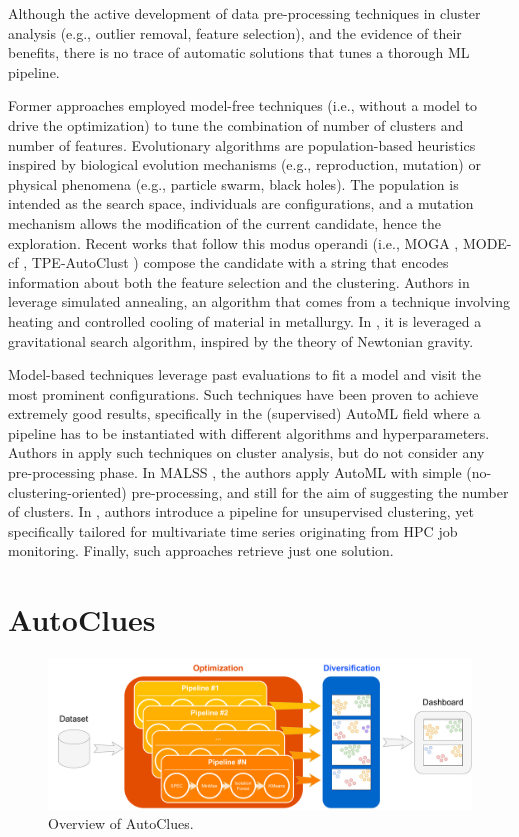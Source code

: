\documentclass[runningheads]{llncs}
\begin{document}
Although the active development of data pre-processing techniques in cluster analysis (e.g., outlier removal, feature selection), and the evidence of their benefits, there is no trace of automatic solutions that tunes a thorough ML pipeline.

Former approaches employed model-free techniques (i.e., without a model to drive the optimization) to tune the combination of number of clusters and number of features.
Evolutionary algorithms are population-based heuristics inspired by biological evolution mechanisms (e.g., reproduction, mutation) or physical phenomena (e.g., particle swarm, black holes).
The population is intended as the search space, individuals are configurations, and a mutation mechanism allows the modification of the current candidate, hence the exploration.
Recent works that follow this modus operandi (i.e., MOGA \cite{dutta2013}, MODE-cf \cite{hancer2020new}, TPE-AutoClust \cite{10031132}) compose the candidate with a string that encodes information about both the feature selection and the clustering.
Authors in \cite{simulate_annealing} leverage simulated annealing, an algorithm that comes from a technique involving heating and controlled cooling of material in metallurgy.
In \cite{prakash2019gravitational}, it is leveraged a gravitational search algorithm, inspired by the theory of Newtonian gravity.

Model-based techniques leverage past evaluations to fit a model and visit the most prominent configurations.
Such techniques have been proven to achieve extremely good results, specifically in the (supervised) AutoML field where a pipeline has to be instantiated with different algorithms and hyperparameters.
Authors in \cite{Tschechlov2021,poulakis2020autoclust,Liu2021} apply such techniques on cluster analysis, but do not consider any pre-processing phase.
In MALSS \cite{Kamoshida2020}, the authors apply AutoML with simple (no-clustering-oriented) pre-processing, and still for the aim of suggesting the number of clusters.
In \cite{ENES20231}, authors introduce a pipeline for unsupervised clustering, yet specifically tailored for multivariate time series originating from HPC job monitoring.
Finally, such approaches retrieve just one solution.

\section{AutoClues}\label{sec:autoclues}

\begin{figure}[t]
    \centering
    \includegraphics[scale=.26]{img/approach.pdf}
    \caption{Overview of AutoClues.}
    \label{fig:overview}
\end{figure}
\end{document}
